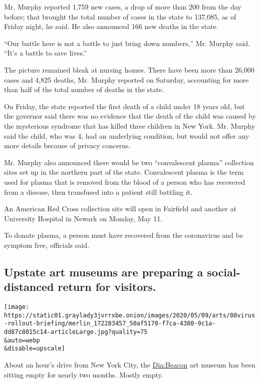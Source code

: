 Mr. Murphy reported 1,759 new cases, a drop of more than 200 from the
day before; that brought the total number of cases in the state to
137,085, as of Friday night, he said. He also announced 166 new deaths
in the state.

``Our battle here is not a battle to just bring down numbers,'' Mr.
Murphy said. ``It's a battle to save lives.''

The picture remained bleak at nursing homes. There have been more than
26,000 cases and 4,825 deaths, Mr. Murphy reported on Saturday,
accounting for more than half of the total number of deaths in the
state.

On Friday, the state reported the first death of a child under 18 years
old, but the governor said there was no evidence that the death of the
child was caused by the mysterious syndrome that has killed three
children in New York. Mr. Murphy said the child, who was 4, had an
underlying condition, but would not offer any more details because of
privacy concerns.

Mr. Murphy also announced there would be two ``convalescent plasma''
collection sites set up in the northern part of the state. Convalescent
plasma is the term used for plasma that is removed from the blood of a
person who has recovered from a disease, then transfused into a patient
still battling it.

An American Red Cross collection site will open in Fairfield and another
at University Hospital in Newark on Monday, May 11.

To donate plasma, a person must have recovered from the coronavirus and
be symptom free, officials said.

\hypertarget{upstate-art-museums-are-preparing-a-social-distanced-return-for-visitors}{%
\subsection{Upstate art museums are preparing a social-distanced return
for
visitors.}\label{upstate-art-museums-are-preparing-a-social-distanced-return-for-visitors}}

\texttt{[image: https://static01.graylady3jvrrxbe.onion/images/2020/05/09/arts/08virus-rollout-briefing/merlin\_172283457\_50af5170-f7ca-4380-9c1a-dd87c8015c14-articleLarge.jpg?quality=75\\\&auto=webp\\\&disable=upscale]}

About an hour's drive from New York City, the
\href{https://www.nytimes3xbfgragh.onion/2019/06/13/arts/design/dia-beacon.html}{Dia:Beacon}
art museum has been sitting empty for nearly two months. Mostly empty.

